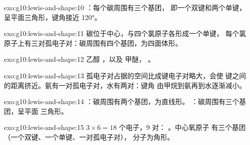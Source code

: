 \begin{solution}{exo:g10:lewis-and-shape:10}
：每个碳周围有三个基团，
即一个双键和两个单键，呈平面三角形，键角接近
\ang{120}。
\end{solution}

\begin{solution}{exo:g10:lewis-and-shape:11}
碳位于中心，与四个氯原子各形成一个单键，
每个氯原子上有三对孤电子对：碳周围有四个基团，为四面体形。
\end{solution}

\begin{solution}{exo:g10:lewis-and-shape:12}
乙醇 ，以及
甲醚，
。
\end{solution}

\begin{solution}{exo:g10:lewis-and-shape:13}
孤电子对占据的空间比成键电子对略大，会使
键之间的距离挤近。氨有一对孤电子对，水有两对：键角
由甲烷到氨再到水逐渐减小。
\end{solution}

\begin{solution}{exo:g10:lewis-and-shape:14}
：碳周围有两个基团，为直线形。
：碳周围有三个基团，呈平面
三角形。
\end{solution}

\begin{solution}{exo:g10:lewis-and-shape:15}
$3 \times 6 = 18$ 个电子，9 对：
。中心氧原子
有三个基团（一个双键、一个单键、一对孤电子对），
分子为角形。
\end{solution}

